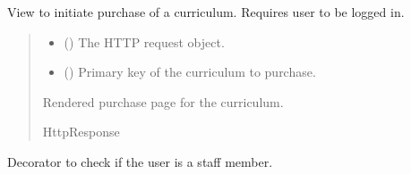 \documentclass[letterpaper,10pt,english]{sphinxmanual}
\begin{document}
\begin{fulllineitems}
\label{\detokenize{courses:courses.views.purchase_curriculum}}
\pysigstartsignatures
\pysiglinewithargsret
{}
{\sphinxparamcomma {}}
{}
\pysigstopsignatures
\sphinxAtStartPar
View to initiate purchase of a curriculum. Requires user to be logged in.
\begin{quote}\begin{description}
\begin{itemize}
\item {} 
\sphinxAtStartPar
{} () \textendash{} The HTTP request object.

\item {} 
\sphinxAtStartPar
{} () \textendash{} Primary key of the curriculum to purchase.

\end{itemize}

\sphinxAtStartPar
Rendered purchase page for the curriculum.

\sphinxAtStartPar
HttpResponse

\end{description}\end{quote}

\end{fulllineitems}


\begin{fulllineitems}
\label{\detokenize{courses:courses.views.staff_required}}
\pysigstartsignatures
\pysiglinewithargsret
{}
{}
{}
\pysigstopsignatures
\sphinxAtStartPar
Decorator to check if the user is a staff member.

\end{fulllineitems}

\end{document}

